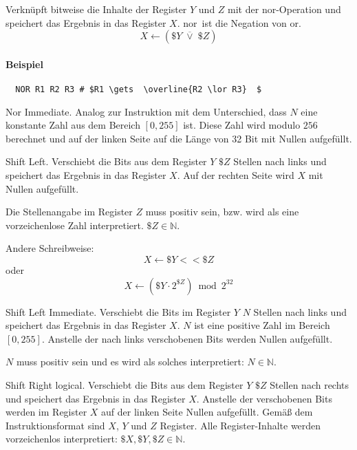 Verknüpft bitweise die Inhalte der Register $Y$ und $Z$ mit der nor-Operation
und speichert das Ergebnis in das Register $X$. \glqq nor\grqq\ ist die Negation
von \glqq or\grqq.
\[
    X \gets (\$Y \; \overline{\lor} \; \$Z)
\]

\paragraph{Beispiel}
\begin{lstlisting}
  NOR R1 R2 R3 # $R1 \gets  \overline{R2 \lor R3}  $
\end{lstlisting}


\glqq Nor Immediate\grqq.
Analog zur Instruktion  mit dem Unterschied, dass $N$ eine konstante
Zahl aus dem Bereich $[0, 255]$ ist. Diese Zahl wird modulo $256$ berechnet und
auf der linken Seite auf die Länge von 32 Bit mit Nullen aufgefüllt.



\glqq Shift Left\grqq.
Verschiebt die Bits aus dem Register $Y$ $\$Z$ Stellen nach links und speichert
das Ergebnis in das Register $X$. Auf der rechten Seite wird $X$ mit Nullen
aufgefüllt.

Die Stellenangabe im Register $Z$ muss positiv sein, bzw. wird als eine
vorzeichenlose Zahl interpretiert. $\$Z \in \mathds{N}$.

Andere Schreibweise:
\[
    X \gets \$Y << \$Z
\]
oder 
\[
    X \gets 
    ( \$Y \cdot 2^{\$Z}  ) \bmod 2^{32}
\]



\glqq Shift Left Immediate\grqq.
Verschiebt die Bits im Register $Y$ $N$ Stellen nach links und speichert das
Ergebnis in das Register $X$.
$N$ ist eine positive Zahl im Bereich $[0, 255]$.
Anstelle der nach links verschobenen Bits werden Nullen aufgefüllt.

$N$ muss positiv sein und es wird als solches interpretiert: $N \in \mathds{N}$.



\glqq Shift Right logical\grqq.
Verschiebt die Bits aus dem Register $Y$ $\$Z$ Stellen nach rechts und speichert
das Ergebnis in das Register $X$. Anstelle der verschobenen Bits werden im
Register $X$ auf der linken Seite Nullen aufgefüllt. Gemäß dem
Instruktionsformat  sind $X$, $Y$ und $Z$ Register. Alle
Register-Inhalte werden vorzeichenlos interpretiert: 
$\$X, \$Y, \$Z \in \mathds{N}$.

